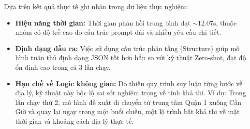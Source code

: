 Dựa trên kết quả thực tế ghi nhận trong dữ liệu thực nghiệm:
\begin{itemize}
    \item \textbf{Hiệu năng thời gian:} Thời gian phản hồi trung bình đạt $\sim$12.07s, thuộc nhóm có độ trễ cao do cấu trúc prompt dài và nhiều yêu cầu chi tiết.
    \item \textbf{Định dạng đầu ra:} Việc sử dụng cấu trúc phân tầng (Structure) giúp mô hình tuân thủ định dạng JSON tốt hơn hẳn so với kỹ thuật Zero-shot, đạt độ ổn định cao trong cả 3 lần chạy.
    \item \textbf{Hạn chế về Logic không gian:} Do thiếu quy trình suy luận từng bước về địa lý, kỹ thuật này bộc lộ sai sót nghiêm trọng về tính khả thi. Ví dụ: Trong lần chạy thứ 2, mô hình đề xuất di chuyển từ trung tâm Quận 1 xuống Cần Giờ và quay lại ngay trong một buổi chiều, một lộ trình bất khả thi về mặt thời gian và khoảng cách địa lý thực tế.
\end{itemize}